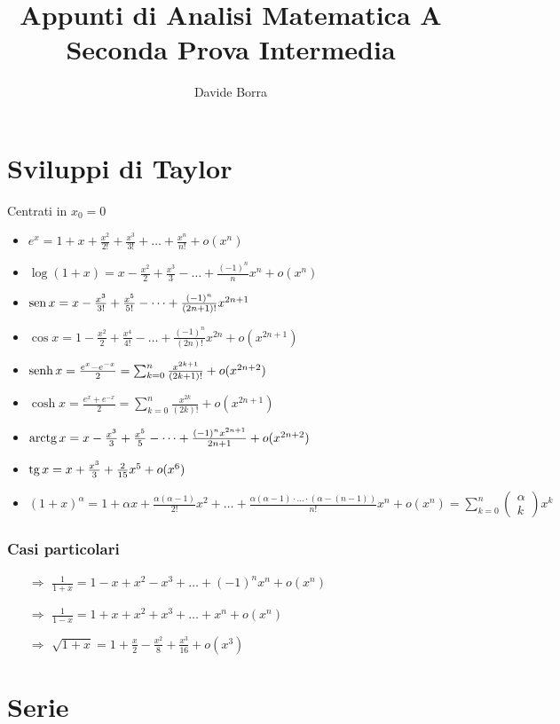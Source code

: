 \documentclass{article}
\title{Appunti di  Analisi Matematica A\\{\small Seconda Prova Intermedia}}
\author{Davide Borra}
\date{}
\renewcommand{\binom}[2]{\begin{pmatrix}#1\\#2\end{pmatrix}}
\begin{document}
\maketitle
{}
\section*{Sviluppi di Taylor}
Centrati in $x_0=0$
\begin{itemize}
    \item $e^x=1+x+\frac{x^2}{2!}+\frac{x^3}{3!}+\dots+\frac{x^n}{n!}+o(x^n)$
    \item $\log(1+x)=x-\frac{x^2}{2}+\frac{x^3}{3}-\dots+\frac{(-1)^n}{n}x^n+o(x^n)$
    \item $\operatorname{sen} x = x-\frac{x^3}{3!}+\frac{x^5}{5!}-\dots+\frac{(-1)^n}{(2n+1)!}x^{2n+1}$
    \item $\cos x = 1-\frac{x^2}{2}+\frac{x^4}{4!}-\dots+\frac{(-1)^n}{(2n)!}x^{2n}+o\left(x^{2n+1}\right)$
    \item $\operatorname{senh} x = \frac{e^x-e^{-x}}{2}=\sum_{k=0}^n\frac{x^{2k+1}}{(2k+1)!}+o(x^{2n+2})$
    \item $\cosh x = \frac{e^x+e^{-x}}{2}=\sum_{k=0}^n\frac{x^{2k}}{(2k)!}+o(x^{2n+1})$
    \item $\operatorname{arctg} x = x-\frac{x^3}{3}+\frac{x^5}{5}-\dots+\frac{(-1)^nx^{2n+1}}{2n+1}+o(x^{2n+2})$
    \item $\operatorname{tg} x = x+\frac{x^3}{3}+\frac{2}{15}x^5+o(x^6)$
    \item $(1+x)^\alpha=1+\alpha x+\frac{\alpha(\alpha-1)}{2!}x^2+\dots+\frac{\alpha(\alpha-1)\cdot \ldots\cdot (\alpha-(n-1))}{n!}x^n+o(x^n)=\sum_{k=0}^n
    \binom{\alpha}{k}x^k$
\end{itemize}
\subsubsection*{Casi particolari}
\begin{itemize}
    \item[$\Rightarrow$] $\frac{1}{1+x}=1-x+x^2-x^3+\dots+(-1)^nx^n+o(x^n)$
    \item[$\Rightarrow$] $\frac{1}{1-x}=1+x+x^2+x^3+\dots+x^n+o(x^n)$
    \item[$\Rightarrow$] $\sqrt{1+x}=1+\frac{x}{2}-\frac{x^2}{8}+\frac{x^3}{16}+o(x^3)$
\end{itemize}
\section*{Serie}
\end{document}
